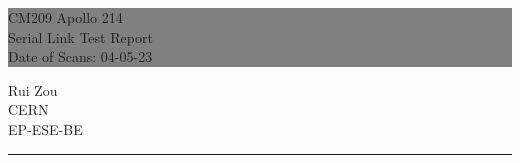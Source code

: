 \documentclass{report}
\newcommand\dateofscans{04-05-23} %
\begin{document}

\begin{titlepage} %
  
  
  \colorbox{grey}{
    \parbox[t]{0.93\textwidth}{ %
      \parbox[t]{0.91\textwidth}{ %
        \raggedleft %
        \fontsize{80pt}{40pt}\selectfont %
        \vspace{0.7cm} %

        CM209 Apollo 214\\
        Serial Link Test Report\\
        Date of Scans: \dateofscans\\
        
        \vspace{0.7cm} %
        }
      }
    }
  
  \vfill %
  
  
  \parbox[t]{0.93\textwidth}{ %
    \raggedleft %
    \large %
    {\Large Rui Zou}\\[4pt] %
    CERN\\
    EP-ESE-BE\\[4pt] %
    
    \hfill\rule{0.2\linewidth}{1pt}%
    }
  
\end{titlepage}

\hypertarget{MyToc}{}  %
\tableofcontents
\newpage
\end{document}
